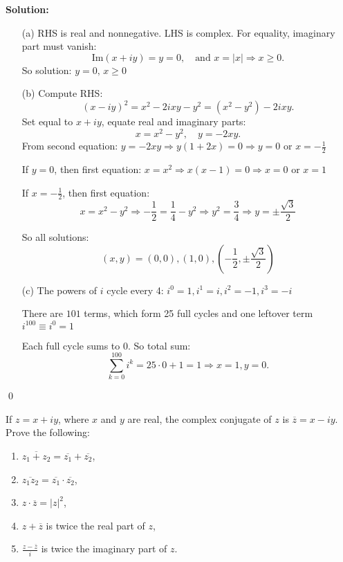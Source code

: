 \bigskip\noindent\textbf{Solution:}

\begin{itemize}
\item[(a)] RHS is real and nonnegative. LHS is complex. For equality, imaginary part must vanish:
\[
\text{Im}(x + iy) = y = 0, \quad \text{and } x = |x| \Rightarrow x \geq 0.
\]
So solution: \( y = 0,\, x \geq 0 \)

\item[(b)] Compute RHS:
\[
(x - iy)^2 = x^2 - 2ixy - y^2 = (x^2 - y^2) - 2ixy.
\]
Set equal to \( x + iy \), equate real and imaginary parts:
\[
x = x^2 - y^2,\quad y = -2xy.
\]
From second equation: \( y = -2xy \Rightarrow y(1 + 2x) = 0 \Rightarrow y = 0 \) or \( x = -\frac{1}{2} \)

If \( y = 0 \), then first equation: \( x = x^2 \Rightarrow x(x - 1) = 0 \Rightarrow x = 0 \) or \( x = 1 \)

If \( x = -\frac{1}{2} \), then first equation:
\[
x = x^2 - y^2 \Rightarrow -\frac{1}{2} = \frac{1}{4} - y^2 \Rightarrow y^2 = \frac{3}{4} \Rightarrow y = \pm \frac{\sqrt{3}}{2}
\]

So all solutions:
\[
(x,y) = (0,0), (1,0), \left(-\frac{1}{2}, \pm \frac{\sqrt{3}}{2} \right)
\]

\item[(c)] The powers of \( i \) cycle every 4: \( i^0 = 1, i^1 = i, i^2 = -1, i^3 = -i \)

There are \( 101 \) terms, which form 25 full cycles and one leftover term \( i^{100} \equiv i^0 = 1 \)

Each full cycle sums to 0. So total sum:
\[
\sum_{k=0}^{100} i^k = 25 \cdot 0 + 1 = 1
\Rightarrow x = 1, y = 0.
\]
\end{itemize}\qed


\begin{problembox}
\begin{problemstatement}
If \( z = x + iy \), where \( x \) and \( y \) are real, the complex conjugate of \( z \) is \( \overline{z} = x - iy \). Prove the following:
\begin{enumerate}[label=\alph*)]
\item \( \overline{z_1 + z_2} = \overline{z_1} + \overline{z_2} \),
\item \( \overline{z_1 z_2} = \overline{z_1} \cdot \overline{z_2} \),
\item \( z \cdot \overline{z} = |z|^2 \),
\item \( z + \overline{z} \) is twice the real part of \( z \),
\item \( \frac{z - \overline{z}}{i} \) is twice the imaginary part of \( z \).
\end{enumerate}
\end{problemstatement}
\end{problembox}

